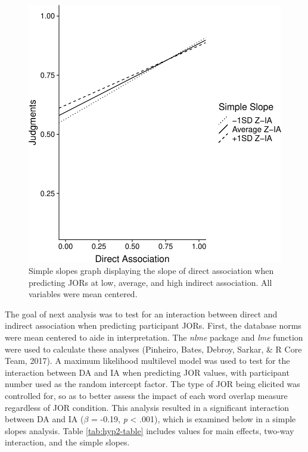 \documentclass[english,,man]{apa6}
\begin{document}
\begin{figure}
\centering
\includegraphics{max_buch_JOL_files/figure-latex/hyp2graph-1.pdf}
\caption{\label{fig:hyp2graph}Simple slopes graph displaying the slope of direct association when predicting JORs at low, average, and high indirect association. All variables were mean centered.}
\end{figure}

The goal of next analysis was to test for an interaction between direct and indirect association when predicting participant JORs. First, the database norms were mean centered to aide in interpretation. The \emph{nlme} package and \emph{lme} function were used to calculate these analyses (Pinheiro, Bates, Debroy, Sarkar, \& R Core Team, 2017). A maximum likelihood multilevel model was used to test for the interaction between DA and IA when predicting JOR values, with participant number used as the random intercept factor. The type of JOR being elicited was controlled for, so as to better assess the impact of each word overlap measure regardless of JOR condition. This analysis resulted in a significant interaction between DA and IA (\(\beta\) = -0.19, \emph{p} \textless{} .001), which is examined below in a simple slopes analysis. Table \ref{tab:hyp2-table} includes values for main effects, two-way interaction, and the simple slopes.
\end{document}
